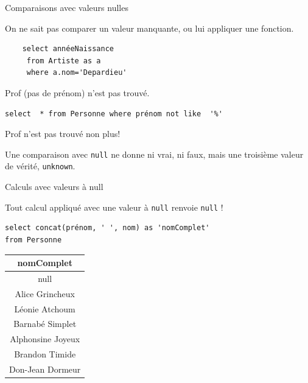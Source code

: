 \begin{frame}[fragile]{Comparaisons avec valeurs nulles}

On ne sait pas comparer un valeur manquante, ou lui appliquer une fonction.

\vfill


\begin{verbatim}
    select annéeNaissance
     from Artiste as a
     where a.nom='Depardieu'

\end{verbatim}

Prof (pas de prénom) n'est pas trouvé.

\vfill

\begin{verbatim}
select  * from Personne where prénom not like  '%'
\end{verbatim}
Prof n'est pas trouvé non plus!
\vfill

\begin{blocgauche}
Une comparaison avec \texttt{null} ne donne ni vrai, ni faux,
mais une troisième valeur de vérité, \texttt{unknown}. 
\end{blocgauche}
\end{frame}


\begin{frame}[fragile]{Calculs avec valeurs à null}

Tout calcul appliqué avec une valeur à \texttt{null} renvoie \texttt{null} !
\vfill


\begin{verbatim}
select concat(prénom, ' ', nom) as 'nomComplet'
from Personne
\end{verbatim}

\vfill

\begin{tabular}{c}
\textbf{nomComplet}\\ \hline 
null\\ \hline 
Alice Grincheux\\ \hline 
Léonie Atchoum\\ \hline 
Barnabé Simplet\\ \hline 
Alphonsine Joyeux\\ \hline 
Brandon Timide\\ \hline 
Don-Jean Dormeur\\ \hline 
\end{tabular}

\end{frame}

